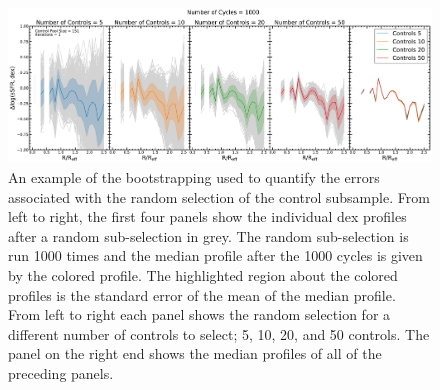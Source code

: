\documentclass[iop,revtex4,twocolumn,apj,numberedappendix,appendixfloats]{emulateapj}
\begin{document}
\begin{figure}
\centering
\includegraphics[width=\linewidth]{fig/8485-3704.pdf}
\caption[Example of bootstrapping to quantify the deviation of the random subsample of controls]{An example of the bootstrapping used to quantify the errors associated with the random selection of the control subsample. From left to right, the first four panels show the individual dex profiles after a random sub-selection in grey. The random sub-selection is run 1000 times and the median profile after the 1000 cycles is given by the colored profile. The highlighted region about the colored profiles is the standard error of the mean of the median profile. From left to right each panel shows the random selection for a different number of controls to select; 5, 10, 20, and 50 controls. The panel on the right end shows the median profiles of all of the preceding panels. }
\label{fig:bootstrap}
\end{figure}
\end{document}
